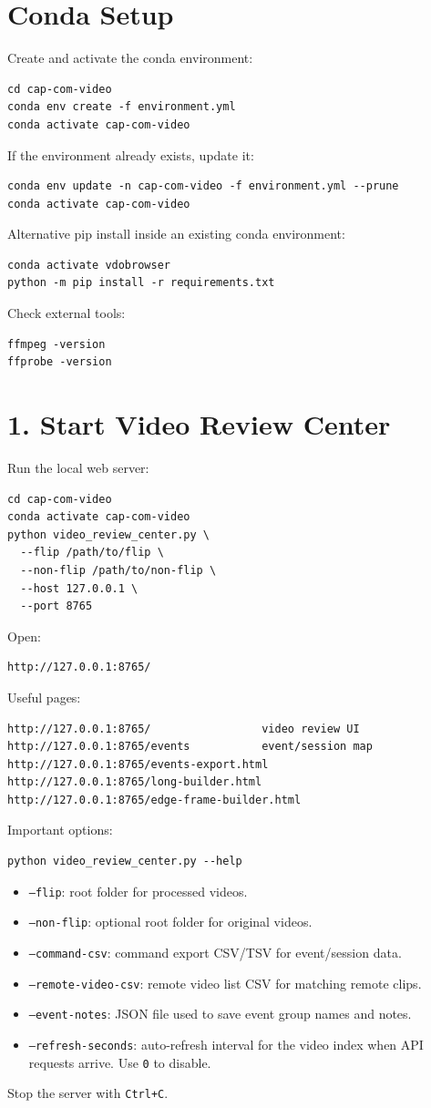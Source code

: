 \documentclass[11pt,a4paper]{article}
\begin{document}
\section{Conda Setup}
Create and activate the conda environment:
\begin{verbatim}
cd cap-com-video
conda env create -f environment.yml
conda activate cap-com-video
\end{verbatim}
If the environment already exists, update it:
\begin{verbatim}
conda env update -n cap-com-video -f environment.yml --prune
conda activate cap-com-video
\end{verbatim}
Alternative pip install inside an existing conda environment:
\begin{verbatim}
conda activate vdobrowser
python -m pip install -r requirements.txt
\end{verbatim}
Check external tools:
\begin{verbatim}
ffmpeg -version
ffprobe -version
\end{verbatim}
\section{1. Start Video Review Center}
Run the local web server:
\begin{verbatim}
cd cap-com-video
conda activate cap-com-video
python video_review_center.py \
  --flip /path/to/flip \
  --non-flip /path/to/non-flip \
  --host 127.0.0.1 \
  --port 8765
\end{verbatim}
Open:
\begin{verbatim}
http://127.0.0.1:8765/
\end{verbatim}
Useful pages:
\begin{verbatim}
http://127.0.0.1:8765/                 video review UI
http://127.0.0.1:8765/events           event/session map
http://127.0.0.1:8765/events-export.html
http://127.0.0.1:8765/long-builder.html
http://127.0.0.1:8765/edge-frame-builder.html
\end{verbatim}
Important options:
\begin{verbatim}
python video_review_center.py --help
\end{verbatim}
\begin{itemize}
\item \texttt{--flip}: root folder for processed videos.
\item \texttt{--non-flip}: optional root folder for original videos.
\item \texttt{--command-csv}: command export CSV/TSV for event/session data.
\item \texttt{--remote-video-csv}: remote video list CSV for matching remote clips.
\item \texttt{--event-notes}: JSON file used to save event group names and notes.
\item \texttt{--refresh-seconds}: auto-refresh interval for the video index when API requests arrive. Use \texttt{0} to disable.
\end{itemize}
Stop the server with \texttt{Ctrl+C}.
\end{document}
